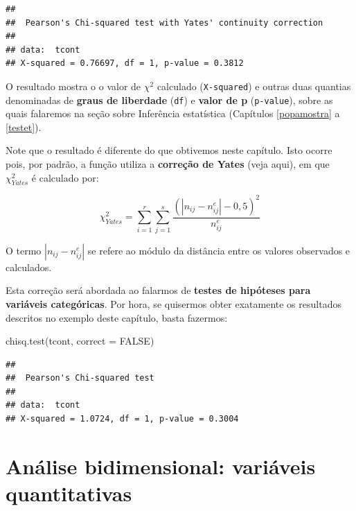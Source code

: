 \documentclass[
]{book}
\newenvironment{Shaded}{\begin{snugshade}}{\end{snugshade}}
\newcommand{\AttributeTok}[1]{\textcolor[rgb]{0.77,0.63,0.00}{#1}}
\newcommand{\ConstantTok}[1]{\textcolor[rgb]{0.00,0.00,0.00}{#1}}
\newcommand{\FunctionTok}[1]{\textcolor[rgb]{0.00,0.00,0.00}{#1}}
\newcommand{\NormalTok}[1]{#1}
\newcommand{\OtherTok}[1]{\textcolor[rgb]{0.56,0.35,0.01}{#1}}
\newcommand{\SpecialCharTok}[1]{\textcolor[rgb]{0.00,0.00,0.00}{#1}}
\begin{document}
\begin{Shaded}
\end{Shaded}

\begin{verbatim}
## 
##  Pearson's Chi-squared test with Yates' continuity correction
## 
## data:  tcont
## X-squared = 0.76697, df = 1, p-value = 0.3812
\end{verbatim}

O resultado mostra o o valor de \(\chi^2\) calculado (\texttt{X-squared}) e outras duas quantias denominadas de \textbf{graus de liberdade} (\texttt{df}) e \textbf{valor de p} (\texttt{p-value}), sobre as quais falaremos na seção sobre Inferência estatística (Capítulos \ref{popamostra} a \ref{testet}).

Note que o resultado é diferente do que obtivemos neste capítulo. Isto ocorre pois, por padrão, a função utiliza a \textbf{correção de Yates} (veja aqui), em que \(\chi_{Yates}^{2}\) é calculado por:

\[\chi_{Yates}^{2} = \sum_{i=1}^{r}\sum_{j=1}^{s}\frac{(|n_{ij} - n_{ij}^{e}| - 0,5)^2}{n_{ij}^{e}}\]

O termo \(|n_{ij} - n_{ij}^{e}|\) se refere ao módulo da distância entre os valores observados e calculados.

Esta correção será abordada ao falarmos de \textbf{testes de hipóteses para variáveis categóricas}. Por hora, se quisermos obter exatamente os resultados descritos no exemplo deste capítulo, basta fazermos:

\begin{Shaded}
\begin{Highlighting}[]
\FunctionTok{chisq.test}\NormalTok{(tcont, }\AttributeTok{correct =} \ConstantTok{FALSE}\NormalTok{)}
\end{Highlighting}
\end{Shaded}

\begin{verbatim}
## 
##  Pearson's Chi-squared test
## 
## data:  tcont
## X-squared = 1.0724, df = 1, p-value = 0.3004
\end{verbatim}

\hypertarget{biquant}{%
\chapter{Análise bidimensional: variáveis quantitativas}\label{biquant}}
\end{document}
